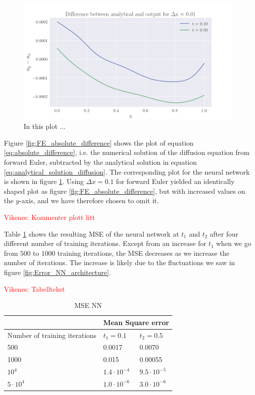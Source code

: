 \documentclass[12pt]{extarticle}
\begin{document}
\begin{figure}[h]
	\centering
	\includegraphics[width=0.8\linewidth]{../output/plots/final_compare_NN.png}
	\caption{In this plot ...} \label{fig:NN_relative_error}
\end{figure}

Figure \ref{fig:FE_absolute_difference} shows the plot of equation \eqref{eq:absolute_difference}, i.e. the numerical solution of the diffusion equation from forward Euler, subtracted by the analytical solution in equation \eqref{eq:analytical_solution_diffusion}. The corresponding plot for the neural network is shown in figure \ref{fig:NN_relative_error}. Using $\Delta x=0.1$ for forward Euler yielded an identically shaped plot as figure \ref{fig:FE_absolute_difference}, but with increased values on the $y$-axis, and we have therefore chosen to omit it. 

\textcolor{red}{Vikenes: Kommenter plott litt}

Table \ref{tab:NN_MSE_iterations} shows the resulting MSE of the neural network at $t_1$ and $t_2$ after four different number of training iterations. Except from an increase for $t_1$ when we go from $500$ to $1000$ training iterations, the MSE decreases as we increase the number of iterations. The increase is likely due to the fluctuations we saw in figure \ref{fig:Error_NN_architecture}.

\textcolor{red}{Vikenes: Tabelltekst}

\begin{table}[h]
	\centering
	\begin{tabular}{l|ll|}
		\cline{2-3}
		& \multicolumn{2}{l|}{Mean Square error} \\ \hline
		\multicolumn{1}{|l|}{Number of training iterations} & \multicolumn{1}{l|}{$t_1 = 0.1$} & $t_2 = 0.5$ \\ \hline
		\multicolumn{1}{|l|}{500}                           & \multicolumn{1}{l|}{0.0017}  & 0.0070  \\ \hline
		\multicolumn{1}{|l|}{1000}                          & \multicolumn{1}{l|}{0.015}   & 0.00055 \\ \hline
		\multicolumn{1}{|l|}{$10^4$}                          & \multicolumn{1}{l|}{$1.4\cdot 10^{-4}$}  & $9.5\cdot10^{-5}$  \\ \hline
		\multicolumn{1}{|l|}{$5\cdot10^4$}                        & \multicolumn{1}{l|}{$1.0\cdot10^{-6}$}        & $3.0\cdot10^{-6}$        \\ \hline
	\end{tabular}
	\caption{MSE NN }
	\label{tab:NN_MSE_iterations}
\end{table}
\end{document}
